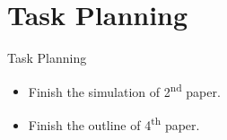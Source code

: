 \section{Task Planning}
\begin{frame}{Task Planning}
    \begin{itemize}
      \item Finish the simulation of 2\textsuperscript{nd} paper.
      \item Finish the outline of 4\textsuperscript{th} paper.
    \end{itemize}
\end{frame} 